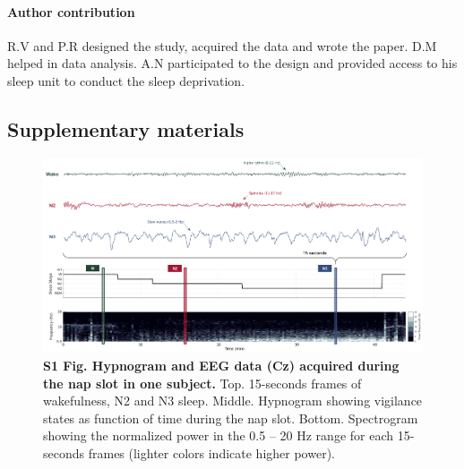 \paragraph{Author contribution}
R.V and P.R designed the study, acquired the data and wrote the paper. D.M helped in data analysis. A.N participated to the design and provided access to his sleep unit to conduct the sleep deprivation.

\newpage

\subsection*{Supplementary materials}
\label{res:inertia:inertia:supp}
\vspace*{1cm}

\begin{figure}[!htbp]
	\includegraphics[width=\textwidth]{Fig/Results/Inertia/Inertia/S1_Scoring.png}
	\caption*{\textbf{S1 Fig. Hypnogram and EEG data (Cz) acquired during the nap slot in one subject.} Top. 15-seconds frames of wakefulness, N2 and N3 sleep. Middle. Hypnogram showing vigilance states as function of time during the nap slot. Bottom. Spectrogram showing the normalized power in the 0.5 – 20 Hz range for each 15-seconds frames (lighter colors indicate higher power).}
\end{figure}

